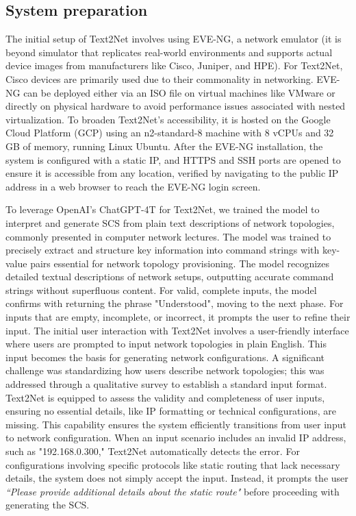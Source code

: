 \vspace{-2mm}
\subsection{System preparation}

The initial setup of Text2Net involves using EVE-NG, a network emulator (it is beyond simulator that replicates real-world environments and supports actual device images from manufacturers like Cisco, Juniper, and HPE). For Text2Net, Cisco devices are primarily used due to their commonality in networking. EVE-NG can be deployed either via an ISO file on virtual machines like VMware or directly on physical hardware to avoid performance issues associated with nested virtualization. To broaden Text2Net’s accessibility, it is hosted on the Google Cloud Platform (GCP) using an n2-standard-8 machine with 8 vCPUs and 32 GB of memory, running Linux Ubuntu. After the EVE-NG installation, the system is configured with a static IP, and HTTPS and SSH ports are opened to ensure it is accessible from any location, verified by navigating to the public IP address in a web browser to reach the EVE-NG login screen.

To leverage OpenAI's ChatGPT-4T for Text2Net, we trained the model to interpret and generate SCS from plain text descriptions of network topologies, commonly presented in computer network lectures. The model was trained to precisely extract and structure key information into command strings with key-value pairs essential for network topology provisioning.
The model recognizes detailed textual descriptions of network setups, outputting accurate command strings without superfluous content. For valid, complete inputs, the model confirms with returning the phrase "Understood", moving to the next phase. For inputs that are empty, incomplete, or incorrect, it prompts the user to refine their input.
The initial user interaction with Text2Net involves a user-friendly interface where users are prompted to input network topologies in plain English. This input becomes the basis for generating network configurations. A significant challenge was standardizing how users describe network topologies; this was addressed through a qualitative survey to establish a standard input format.
Text2Net is equipped to assess the validity and completeness of user inputs, ensuring no essential details, like IP formatting or technical configurations, are missing. This capability ensures the system efficiently transitions from user input to network configuration. 
When an input scenario includes an invalid IP address, such as "192.168.0.300," Text2Net automatically detects the error. For configurations involving specific protocols like static routing that lack necessary details, the system does not simply accept the input. Instead, it prompts the user \textit{``Please provide additional details about the static route"} before proceeding with generating the SCS.

